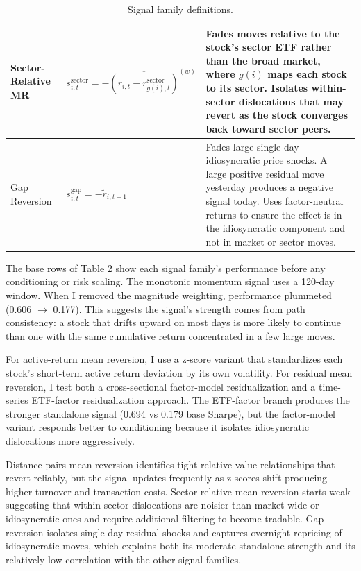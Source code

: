 \documentclass{article}
\begin{document}
\begin{table}[H]
\begin{tabular}{p{2.8cm} >{\raggedright\arraybackslash}p{4.5cm} >{\raggedright\arraybackslash}p{7cm}}
        \midrule
        Sector-Relative MR &
        $s^{\text{sector}}_{i,t} = -\overline{(r_{i,t} - r^{\text{sector}}_{g(i),t})}^{(w)}$ &
        Fades moves relative to the stock's sector ETF rather than the broad market, where $g(i)$ maps each stock to its sector. Isolates within-sector dislocations that may revert as the stock converges back toward sector peers. \\
        \midrule
        Gap Reversion &
        $s^{\text{gap}}_{i,t} = -\tilde{r}_{i,t-1}$ &
        Fades large single-day idiosyncratic price shocks. A large positive residual move yesterday produces a negative signal today. Uses factor-neutral returns to ensure the effect is in the idiosyncratic component and not in market or sector moves. \\
        \bottomrule
    \end{tabular}
    \caption{Signal family definitions.}
\end{table}

The base rows of Table 2 show each signal family’s performance before any conditioning or risk scaling. The monotonic momentum signal uses a 120-day window. When I removed the magnitude weighting, performance plummeted (0.606 $\to$ 0.177). This suggests the signal’s strength comes from path consistency: a stock that drifts upward on most days is more likely to continue than one with the same cumulative return concentrated in a few large moves.

For active-return mean reversion, I use a z-score variant that standardizes each stock’s short-term active return deviation by its own volatility. For residual mean reversion, I test both a cross-sectional factor-model residualization and a time-series ETF-factor residualization approach. The ETF-factor branch produces the stronger standalone signal (0.694 vs 0.179 base Sharpe), but the factor-model variant responds better to conditioning because it isolates idiosyncratic dislocations more aggressively.

Distance-pairs mean reversion identifies tight relative-value relationships that revert reliably, but the signal updates frequently as z-scores shift producing higher turnover and transaction costs. Sector-relative mean reversion starts weak suggesting that within-sector dislocations are noisier than market-wide or idiosyncratic ones and require additional filtering to become tradable. Gap reversion isolates single-day residual shocks and captures overnight repricing of idiosyncratic moves, which explains both its moderate standalone strength and its relatively low correlation with the other signal families.
\end{document}

